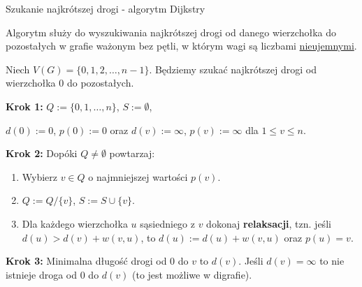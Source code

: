 \documentclass[a4paper,10pt]{beamer}
\begin{document}
\begin{frame}{Szukanie najkrótszej drogi - algorytm Dijkstry}
	
	Algorytm służy do wyszukiwania najkrótszej drogi od danego wierzchołka do pozostałych w grafie ważonym bez pętli, w którym wagi są liczbami \underline{nieujemnymi}.
	
	\begin{block}{}
		Niech $V(G)=\{0,1,2,\ldots,n-1\}$. Będziemy szukać najkrótszej drogi od wierzchołka $0$ do pozostałych.
		
		{\bf Krok 1:} $Q:=\{0,1,\ldots,n\}$, $S:=\emptyset$,
		
		$d(0):=0$, $p(0):=0$ oraz $d(v):=\infty$, $p(v):=\infty$ dla $1\leq v\leq n$.
		
		{\bf Krok 2:} Dopóki $Q\neq\emptyset$ powtarzaj:
		\begin{enumerate}
			\item Wybierz $v\in Q$ o najmniejszej wartości $p(v)$.
			\item $Q:=Q/\{v\}$, $S:=S\cup\{v\}$.
			\item Dla każdego wierzchołka $u$ sąsiedniego z $v$ dokonaj {\bf relaksacji}, tzn. jeśli $d(u)>d(v)+w(v,u)$, to $d(u):=d(u)+w(v,u)$ oraz $p(u)=v$.
		\end{enumerate} 
		{\bf Krok 3:} Minimalna długość drogi od $0$ do $v$ to $d(v)$. Jeśli $d(v)=\infty$ to nie istnieje droga od $0$ do $d(v)$ (to jest możliwe w digrafie).
	\end{block}
	
\end{frame}
\end{document}
